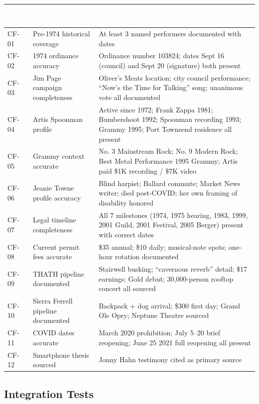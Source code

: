 \documentclass[11pt,letterpaper]{article}
\newcommand{\tableheader}[1]{\textbf{\sffamily\textcolor{white}{#1}}}
\begin{document}
\begin{center}
\begin{tabularx}{\textwidth}{L{1.5cm}L{5cm}X}
\toprule
{}
\tableheader{Test ID} & \tableheader{Verifies} & \tableheader{Expected} \\
\midrule
CF-01 & Pre-1974 historical coverage & At least 3 named performers documented with dates \\
CF-02 & 1974 ordinance accuracy & Ordinance number 103824; dates Sept 16 (council) and Sept 20 (signature) both present \\
CF-03 & Jim Page campaign completeness & Oliver's Meats location; city council performance; ``Now's the Time for Talking'' song; unanimous vote all documented \\
CF-04 & Artis Spoonman profile & Active since 1972; Frank Zappa 1981; Bumbershoot 1992; Spoonman recording 1993; Grammy 1995; Port Townsend residence all present \\
CF-05 & Grammy context accurate & No. 3 Mainstream Rock; No. 9 Modern Rock; Best Metal Performance 1995 Grammy; Artis paid \$1K recording / \$7K video \\
CF-06 & Jeanie Towne profile accuracy & Blind harpist; Ballard commute; Market News writer; died post-COVID; her own framing of disability honored \\
CF-07 & Legal timeline completeness & All 7 milestones (1974, 1975 hearing, 1983, 1999, 2001 Guild, 2001 Festival, 2005 Berger) present with correct dates \\
CF-08 & Current permit fees accurate & \$35 annual; \$10 daily; musical-note spots; one-hour rotation documented \\
CF-09 & THATH pipeline documented & Stairwell busking; ``cavernous reverb'' detail; \$17 earnings; Gold debut; 30,000-person rooftop concert all sourced \\
CF-10 & Sierra Ferrell pipeline documented & Backpack + dog arrival; \$300 first day; Grand Ole Opry; Neptune Theatre sourced \\
CF-11 & COVID dates accurate & March 2020 prohibition; July 5--20 brief reopening; June 25 2021 full reopening all present \\
CF-12 & Smartphone thesis sourced & Jonny Hahn testimony cited as primary source \\
\bottomrule
\end{tabularx}
\end{center}

\subsection{Integration Tests}
\end{document}
